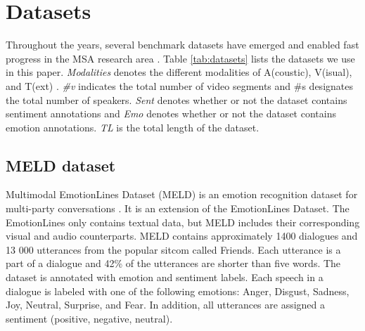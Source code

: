 \section{Datasets}
Throughout the years, several benchmark datasets have emerged and enabled fast progress in the MSA research area \cite{COGMEN_joshi-etal-2022-cogmen}.  Table \ref{tab:datasets} lists the datasets we use in this paper. \textit{Modalities} denotes the different modalities of A(coustic), V(isual), and T(ext) \cite{HP_RPP}. \textit{\#v} indicates the total number of video segments and \#s designates the total number of speakers. \textit{Sent} denotes whether or not the dataset contains sentiment annotations and \textit{Emo} denotes whether or not the dataset contains emotion annotations. \textit{TL} is the total length of the dataset. 
%
\begin{table}[h]
\caption{Benchmark MSA datasets}
\centering
{}
\label{tab:datasets}
\end{table}

\subsection{MELD dataset}
Multimodal EmotionLines Dataset (MELD) is an emotion recognition dataset for multi-party conversations \cite{meld_dataset}. It is an extension of the EmotionLines Dataset. The EmotionLines only contains textual data, but MELD includes their corresponding visual and audio counterparts. MELD contains approximately 1400 dialogues and 13 000 utterances from the popular sitcom called Friends. Each utterance is a part of a dialogue and 42\% of the utterances are shorter than five words. The dataset is annotated with emotion and sentiment labels. Each speech in a dialogue is labeled with one of the following emotions: Anger, Disgust, Sadness, Joy, Neutral, Surprise, and Fear. In addition, all utterances are assigned a sentiment (positive, negative, neutral). 


